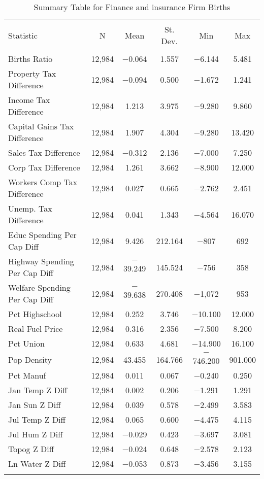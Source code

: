 
\begin{table}[!htbp] \centering 
  \caption{Summary Table for  Finance and insurance Firm Births} 
  \label{52summary} 
\begin{tabular}{@{\extracolsep{5pt}}lccccc} 
\\[-1.8ex]\hline 
\hline \\[-1.8ex] 
Statistic & \multicolumn{1}{c}{N} & \multicolumn{1}{c}{Mean} & \multicolumn{1}{c}{St. Dev.} & \multicolumn{1}{c}{Min} & \multicolumn{1}{c}{Max} \\ 
\hline \\[-1.8ex] 
Births Ratio & 12,984 & $-$0.064 & 1.557 & $-$6.144 & 5.481 \\ 
Property Tax Difference & 12,984 & $-$0.094 & 0.500 & $-$1.672 & 1.241 \\ 
Income Tax Difference & 12,984 & 1.213 & 3.975 & $-$9.280 & 9.860 \\ 
Capital Gains Tax Difference & 12,984 & 1.907 & 4.304 & $-$9.280 & 13.420 \\ 
Sales Tax Difference & 12,984 & $-$0.312 & 2.136 & $-$7.000 & 7.250 \\ 
Corp Tax Difference & 12,984 & 1.261 & 3.662 & $-$8.900 & 12.000 \\ 
Workers Comp Tax Difference & 12,984 & 0.027 & 0.665 & $-$2.762 & 2.451 \\ 
Unemp. Tax Difference & 12,984 & 0.041 & 1.343 & $-$4.564 & 16.070 \\ 
Educ Spending Per Cap Diff & 12,984 & 9.426 & 212.164 & $-$807 & 692 \\ 
Highway Spending Per Cap Diff & 12,984 & $-$39.249 & 145.524 & $-$756 & 358 \\ 
Welfare Spending Per Cap Diff & 12,984 & $-$39.638 & 270.408 & $-$1,072 & 953 \\ 
Pct Highschool & 12,984 & 0.252 & 3.746 & $-$10.100 & 12.000 \\ 
Real Fuel Price & 12,984 & 0.316 & 2.356 & $-$7.500 & 8.200 \\ 
Pct Union & 12,984 & 0.633 & 4.681 & $-$14.900 & 16.100 \\ 
Pop Density & 12,984 & 43.455 & 164.766 & $-$746.200 & 901.000 \\ 
Pct Manuf & 12,984 & 0.011 & 0.067 & $-$0.240 & 0.250 \\ 
Jan Temp Z Diff & 12,984 & 0.002 & 0.206 & $-$1.291 & 1.291 \\ 
Jan Sun Z Diff & 12,984 & 0.039 & 0.578 & $-$2.499 & 3.583 \\ 
Jul Temp Z Diff & 12,984 & 0.065 & 0.600 & $-$4.475 & 4.115 \\ 
Jul Hum Z Diff & 12,984 & $-$0.029 & 0.423 & $-$3.697 & 3.081 \\ 
Topog Z Diff & 12,984 & $-$0.024 & 0.648 & $-$2.578 & 2.123 \\ 
Ln Water Z Diff & 12,984 & $-$0.053 & 0.873 & $-$3.456 & 3.155 \\ 
\hline \\[-1.8ex] 
\end{tabular} 
\end{table} 
